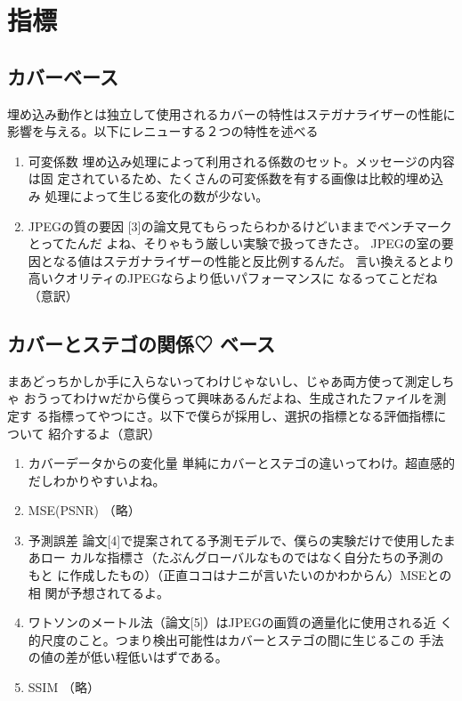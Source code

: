 \documentclass[a4j,fleqn,10pt]{jsarticle}
\begin{document}
\section{指標}
\subsection{カバーベース}
埋め込み動作とは独立して使用されるカバーの特性はステガナライザーの性能に
影響を与える。以下にレニューする２つの特性を述べる
\begin{enumerate}
 \item 可変係数
       埋め込み処理によって利用される係数のセット。メッセージの内容は固
       定されているため、たくさんの可変係数を有する画像は比較的埋め込み
       処理によって生じる変化の数が少ない。
 \item JPEGの質の要因
       [3]の論文見てもらったらわかるけどいままでベンチマークとってたんだ
       よね、そりゃもう厳しい実験で扱ってきたさ。
       JPEGの室の要因となる値はステガナライザーの性能と反比例するんだ。
       言い換えるとより高いクオリティのJPEGならより低いパフォーマンスに
       なるってことだね（意訳）
\end{enumerate}

\subsection{カバーとステゴの関係♡ ベース}
まあどっちかしか手に入らないってわけじゃないし、じゃあ両方使って測定しちゃ
おうってわけｗだから僕らって興味あるんだよね、生成されたファイルを測定す
る指標ってやつにさ。以下で僕らが採用し、選択の指標となる評価指標について
紹介するよ（意訳）

\begin{enumerate}
 \item カバーデータからの変化量
       単純にカバーとステゴの違いってわけ。超直感的だしわかりやすいよね。
 \item MSE(PSNR)
       （略）
 \item 予測誤差
       論文[4]で提案されてる予測モデルで、僕らの実験だけで使用したまあロー
       カルな指標さ（たぶんグローバルなものではなく自分たちの予測のもと
       に作成したもの）（正直ココはナニが言いたいのかわからん）MSEとの相
       関が予想されてるよ。
 \item ワトソンのメートル法（論文[5]）はJPEGの画質の適量化に使用される近
       く的尺度のこと。つまり検出可能性はカバーとステゴの間に生じるこの
       手法の値の差が低い程低いはずである。
 \item SSIM
       （略）
\end{enumerate}
\end{document}
